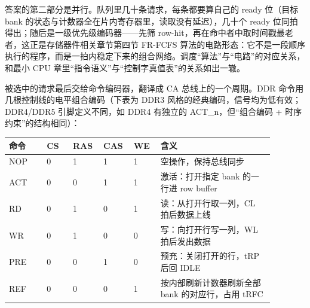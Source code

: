 答案的第二部分是并行。队列里几十条请求，每条都要算自己的 ready 位（目标 bank 的状态与计数器全在片内寄存器里，读取没有延迟），几十个 ready 位同拍得出；随后是一级优先级编码器——先筛 row-hit，再在命中者中取时间戳最老者，这正是存储器件相关章节第四节 FR-FCFS 算法的电路形态：它不是一段顺序执行的程序，而是一拍内稳定下来的组合网络。调度“算法”与“电路”的对应关系，和最小 CPU 章里“指令语义”与“控制字真值表”的关系如出一辙。

被选中的请求最后交给命令编码器，翻译成 CA 总线上的一个周期。DDR 命令用几根控制线的电平组合编码（下表为 DDR3 风格的经典编码，信号均为低有效；DDR4/DDR5 引脚定义不同，如 DDR4 有独立的 ACT\_n，但“组合编码 + 时序约束”的结构相同）：

\begin{longtable}{L{0.13\linewidth}L{0.09\linewidth}L{0.09\linewidth}L{0.09\linewidth}L{0.09\linewidth}L{0.39\linewidth}}
\toprule
命令 & CS & RAS & CAS & WE & 含义 \\
\midrule
NOP & 0 & 1 & 1 & 1 & 空操作，保持总线同步 \\\tablerowrule
ACT & 0 & 0 & 1 & 1 & 激活：打开指定 bank 的一行进 row buffer \\\tablerowrule
RD & 0 & 1 & 0 & 1 & 读：从打开行取一列，CL 拍后数据上线 \\\tablerowrule
WR & 0 & 1 & 0 & 0 & 写：向打开行写一列，WL 拍后发出数据 \\\tablerowrule
PRE & 0 & 0 & 1 & 0 & 预充：关闭打开的行，tRP 后回 IDLE \\\tablerowrule
REF & 0 & 0 & 0 & 1 & 按内部刷新计数器刷新全部 bank 的对应行，占用 tRFC \\
\bottomrule
\end{longtable}

